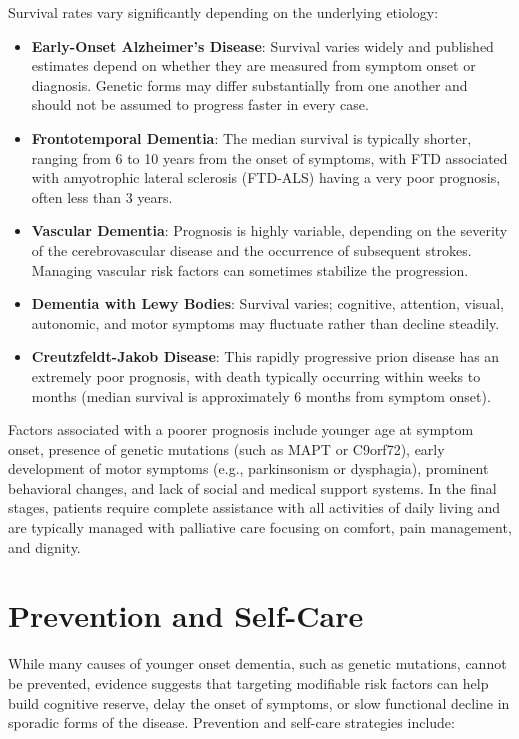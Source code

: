 Survival rates vary significantly depending on the underlying etiology:
\begin{itemize}
    \item \textbf{Early-Onset Alzheimer's Disease}: Survival varies widely and published estimates depend on whether they are measured from symptom onset or diagnosis. Genetic forms may differ substantially from one another and should not be assumed to progress faster in every case.
    \item \textbf{Frontotemporal Dementia}: The median survival is typically shorter, ranging from 6 to 10 years from the onset of symptoms, with FTD associated with amyotrophic lateral sclerosis (FTD-ALS) having a very poor prognosis, often less than 3 years.
    \item \textbf{Vascular Dementia}: Prognosis is highly variable, depending on the severity of the cerebrovascular disease and the occurrence of subsequent strokes. Managing vascular risk factors can sometimes stabilize the progression.
    \item \textbf{Dementia with Lewy Bodies}: Survival varies; cognitive, attention, visual, autonomic, and motor symptoms may fluctuate rather than decline steadily.
    \item \textbf{Creutzfeldt-Jakob Disease}: This rapidly progressive prion disease has an extremely poor prognosis, with death typically occurring within weeks to months (median survival is approximately 6 months from symptom onset).
\end{itemize}

Factors associated with a poorer prognosis include younger age at symptom onset, presence of genetic mutations (such as MAPT or C9orf72), early development of motor symptoms (e.g., parkinsonism or dysphagia), prominent behavioral changes, and lack of social and medical support systems. In the final stages, patients require complete assistance with all activities of daily living and are typically managed with palliative care focusing on comfort, pain management, and dignity.

\section*{Prevention and Self-Care}
While many causes of younger onset dementia, such as genetic mutations, cannot be prevented, evidence suggests that targeting modifiable risk factors can help build cognitive reserve, delay the onset of symptoms, or slow functional decline in sporadic forms of the disease. Prevention and self-care strategies include:

